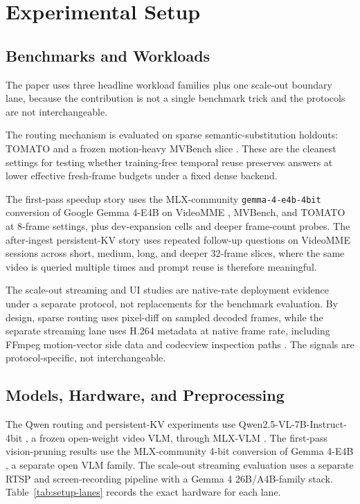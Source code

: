\section{Experimental Setup}

\subsection{Benchmarks and Workloads}

The paper uses three headline workload families plus one scale-out boundary
lane, because the contribution is not a single benchmark trick and the
protocols are not interchangeable.

The routing mechanism is evaluated on sparse semantic-substitution holdouts:
TOMATO \cite{tomato} and a frozen motion-heavy MVBench slice \cite{mvbench}.
These are the cleanest settings for testing whether training-free temporal
reuse preserves answers at lower effective fresh-frame budgets under a fixed
dense backend.

The first-pass speedup story uses the MLX-community
\texttt{gemma-4-e4b-4bit} conversion of Google Gemma 4-E4B on VideoMME
\cite{gemma4e4b,gemma4e4bmlx,videomme}, MVBench, and TOMATO at 8-frame
settings, plus dev-expansion cells and deeper frame-count probes. The
after-ingest persistent-KV story uses repeated follow-up questions on VideoMME
sessions across short, medium, long, and deeper 32-frame slices, where the same
video is queried multiple times and prompt reuse is therefore meaningful.

The scale-out streaming and UI studies are native-rate deployment evidence
under a separate protocol, not replacements for the benchmark evaluation.
By design, sparse routing uses pixel-diff on sampled decoded frames, while the
separate streaming lane uses H.264 metadata at native frame rate, including
FFmpeg motion-vector side data and codecview inspection paths
\cite{ffmpegcodecs,ffmpegfilters}. The signals are protocol-specific, not
interchangeable.

\subsection{Models, Hardware, and Preprocessing}

The Qwen routing and persistent-KV experiments use Qwen2.5-VL-7B-Instruct-4bit
\cite{qwen25vl}, a frozen open-weight video VLM, through MLX-VLM
\cite{mlxvlm}. The first-pass vision-pruning results use the MLX-community
4-bit conversion of Gemma 4-E4B \cite{gemma4e4b,gemma4e4bmlx}, a separate open
VLM family. The scale-out streaming evaluation uses a separate RTSP and
screen-recording pipeline with a Gemma 4 26B/A4B-family stack. Table~\ref{tab:setup-lanes}
records the exact hardware for each lane.

